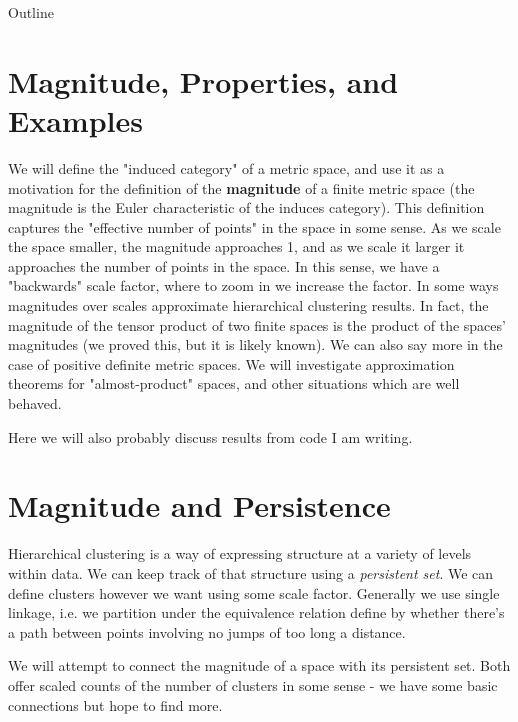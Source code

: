 \documentclass[12pt]{pom_thesis}
\begin{document}
\begin{chapter}{Outline}
\section{Magnitude, Properties, and Examples}
We will define the "induced category" of a metric space, and use it as a motivation for the definition of the \textbf{magnitude} of a finite metric space\cite{Lein2} (the magnitude is the Euler characteristic of the induces category). This definition captures the "effective number of points" in the space in some sense. As we scale the space smaller, the magnitude approaches 1, and as we scale it larger it approaches the number of points in the space. In this sense, we have a "backwards" scale factor, where to zoom in we increase the factor. 
In some ways magnitudes over scales approximate hierarchical clustering results. In fact, the magnitude of the tensor product of two finite spaces is the product of the spaces' magnitudes (we proved this, but it is likely known). We can also say more in the case of positive definite metric spaces\cite{Meck1}. We will investigate approximation theorems for "almost-product" spaces, and other situations which are well behaved.

Here we will also probably discuss results from code I am writing.
\section{Magnitude and Persistence}
Hierarchical clustering is a way of expressing structure at a variety of levels within data. We can keep track of that structure using a \textit{persistent set}\cite{Carl1}. We can define clusters however we want using some scale factor. Generally we use single linkage, i.e. we partition under the equivalence relation define by whether there's a path between points involving no jumps of too long a distance. 

We will attempt to connect the magnitude of a space with its persistent set. Both offer scaled counts of the number of clusters in some sense - we have some basic connections but hope to find more.
\end{chapter}
\end{document}
